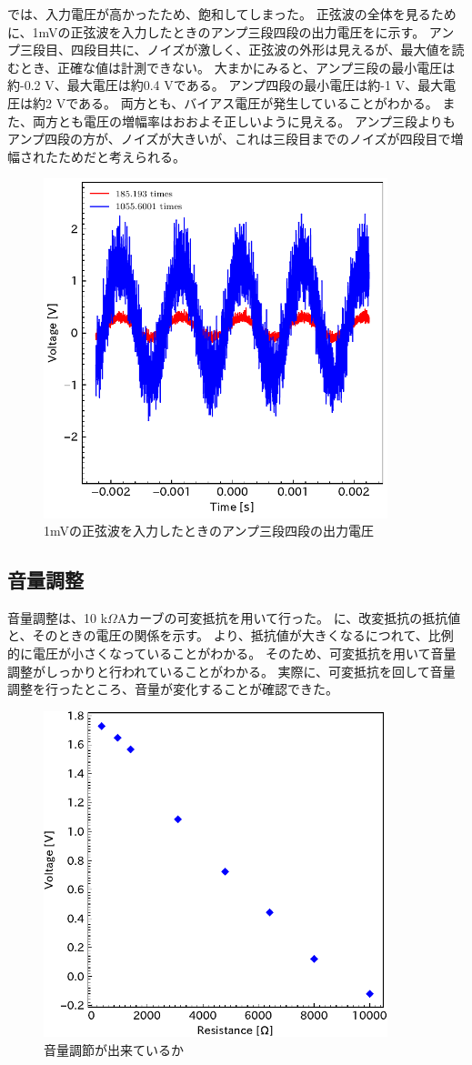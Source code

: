\documentclass[report.tex]{subfiles}
\begin{document}
では、入力電圧が高かったため、飽和してしまった。
正弦波の全体を見るために、1mVの正弦波を入力したときのアンプ三段四段の出力電圧をに示す。
アンプ三段目、四段目共に、ノイズが激しく、正弦波の外形は見えるが、最大値を読むとき、正確な値は計測できない。
大まかにみると、アンプ三段の最小電圧は約-0.2 V、最大電圧は約0.4 Vである。
アンプ四段の最小電圧は約-1 V、最大電圧は約2 Vである。
両方とも、バイアス電圧が発生していることがわかる。
また、両方とも電圧の増幅率はおおよそ正しいように見える。
アンプ三段よりもアンプ四段の方が、ノイズが大きいが、これは三段目までのノイズが四段目で増幅されたためだと考えられる。

\begin{figure}[H]
	\centering
	\includegraphics[width=10cm]{fig/level34_1m.pdf}
	\caption{1mVの正弦波を入力したときのアンプ三段四段の出力電圧}
	\label{fig:34_1m}
\end{figure}

\subsection{音量調整}

音量調整は、10 k\(\Omega\)Aカーブの可変抵抗を用いて行った。
に、改変抵抗の抵抗値と、そのときの電圧の関係を示す。
より、抵抗値が大きくなるにつれて、比例的に電圧が小さくなっていることがわかる。
そのため、可変抵抗を用いて音量調整がしっかりと行われていることがわかる。
実際に、可変抵抗を回して音量調整を行ったところ、音量が変化することが確認できた。

\begin{figure}[H]
	\centering
	\includegraphics[width=10cm]{fig/resi.pdf}
	\caption{音量調節が出来ているか}
	\label{fig:resi}
\end{figure}
\end{document}
